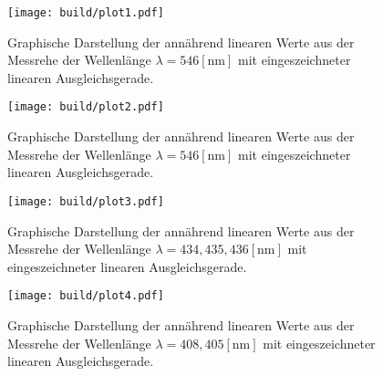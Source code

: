 




\begin{figure}
    \centering
    \texttt{[image: build/plot1.pdf]}
    \caption{Graphische Darstellung der annährend linearen Werte aus der Messrehe der Wellenlänge $\lambda = 546 [\si{\nano\meter}]$ mit eingeszeichneter linearen Ausgleichsgerade.} 
    \label{fig:müdes}
\end{figure}

\begin{figure}
    \centering
    \texttt{[image: build/plot2.pdf]}
    \caption{Graphische Darstellung der annährend linearen Werte aus der Messrehe der Wellenlänge $\lambda = 546 [\si{\nano\meter}]$ mit eingeszeichneter linearen Ausgleichsgerade.} 
    \label{fig:grün}
\end{figure}

\begin{figure}
    \centering
    \texttt{[image: build/plot3.pdf]}
    \caption{Graphische Darstellung der annährend linearen Werte aus der Messrehe der Wellenlänge $\lambda = 434,435,436 [\si{\nano\meter}]$ mit eingeszeichneter linearen Ausgleichsgerade.} 
    \label{fig:violet}
\end{figure}

\begin{figure}
    \centering
    \texttt{[image: build/plot4.pdf]}
    \caption{Graphische Darstellung der annährend linearen Werte aus der Messrehe der Wellenlänge $\lambda = 408,405 [\si{\nano\meter}]$ mit eingeszeichneter linearen Ausgleichsgerade.} 
    \label{fig:GIGAviolet}
\end{figure}








